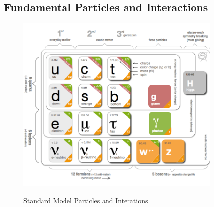 \subsection{Fundamental Particles and Interactions}
\label{sec:Intro_FundParticles}

\begin{figure}[htb]
  \begin{center}
    {\includegraphics[width=0.90\textwidth]{../figs/Intro/StandardModel.png}}
    \caption{Standard Model Particles and Interations}
    \label{fig:SMtable}
  \end{center}
\end{figure}


